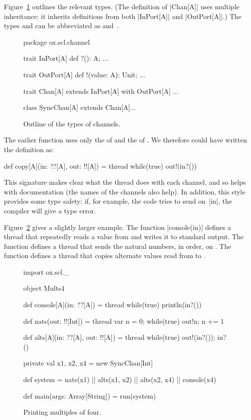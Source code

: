 Figure~\ref{fig:channel-types} outlines the relevant types.  (The definition
of |Chan[A]| uses multiple inheritance: it inherits definitions from both
|InPort[A]| and |OutPort[A]|.)  The types  and
 can be abbreviated as  and~\SCALA{!![A]}.


\begin{figure}
\begin{scala}
package ox.scl.channel

trait InPort[A]{ def ?(): A; ... }
        
trait OutPort[A]{ def !(value: A): Unit; ... }
  
trait Chan[A] extends InPort[A] with OutPort[A]{ ... }

class SyncChan[A] extends Chan[A]{...} 
\end{scala}
\caption{Outline of the types of channels.}
\label{fig:channel-types}
\end{figure}


The earlier function  uses only the  of 
and the  of .  We therefore could have written the
definition as:
%
\begin{scala}
def copy[A](in: ??[A], out: !![A]) = thread{ 
  while(true) out!(in?()) 
}
\end{scala}
%
This signature makes clear what the thread does with each channel, and so
helps with documentation (the names of the channels also help).  In addition,
this style provides some  type safety: if, for example, the code tries to send
on~|in|, the compiler will give a type error. 


Figure~\ref{fig:Mults4} gives a slightly larger example.  The function
|console(in)| defines a thread that repeatedly reads a value from 
and writes it to standard output.  The function  defines a
thread that sends the natural numbers, in order, on .  The function
 defines a thread that copies alternate values read from
 to .


\begin{figure}
\begin{scala}
import ox.scl._

object Mults4{
  def console[A](in: ??[A]) = thread{ while(true) println(in?()) }

  def nats(out: !![Int]) = thread{ 
    var n = 0; while(true){ out!n; n += 1 }
  }

  def alts[A](in: ??[A], out: !![A]) = thread{ 
    while(true){ out!(in?()); in?() } 
  }

  private val x1, x2, x4 = new SyncChan[Int]

  def system = nats(x1) || alts(x1, x2) || alts(x2, x4) || console(x4)

  def main(args: Array[String]) = run(system)
}
\end{scala}
\caption{Printing multiples of four.}
\label{fig:Mults4}
\end{figure}

